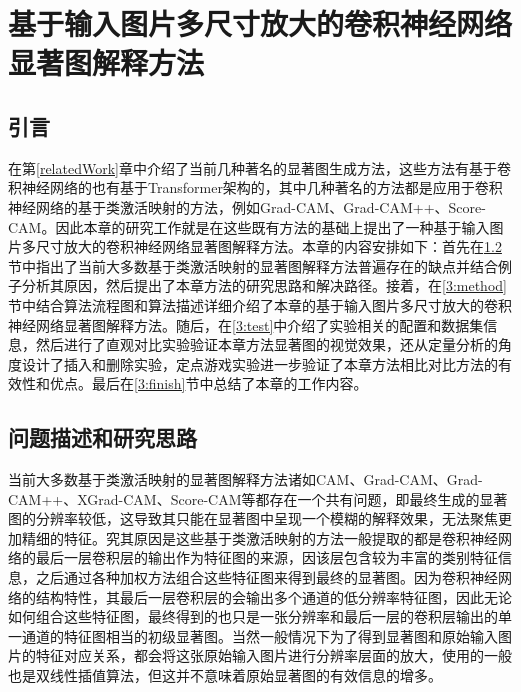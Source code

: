 


\chapter[基于输入图片多尺寸放大的卷积神经网络显著图解释方法]{\texorpdfstring{基于输入图片多尺寸放大的卷积神经网络\\显著图解释方法}{基于输入图片多尺寸放大的卷积神经网络显著图解释方法}}\label{MSGCAM}
\thispagestyle{others}
\pagestyle{others}
\xiaosi

\section{引言}
在第\ref{relatedWork}章中介绍了当前几种著名的显著图生成方法，这些方法有基于卷积神经网络的也有基于Transformer架构的，其中几种著名的方法都是应用于卷积神经网络的基于类激活映射的方法，例如Grad-CAM、Grad-CAM++、Score-CAM。因此本章的研究工作就是在这些既有方法的基础上提出了一种基于输入图片多尺寸放大的卷积神经网络显著图解释方法。本章的内容安排如下：首先在\ref{3:problem}节中指出了当前大多数基于类激活映射的显著图解释方法普遍存在的缺点并结合例子分析其原因，然后提出了本章方法的研究思路和解决路径。接着，在\ref{3:method}节中结合算法流程图和算法描述详细介绍了本章的基于输入图片多尺寸放大的卷积神经网络显著图解释方法。随后，在\ref{3:test}中介绍了实验相关的配置和数据集信息，然后进行了直观对比实验验证本章方法显著图的视觉效果，还从定量分析的角度设计了插入和删除实验，定点游戏实验进一步验证了本章方法相比对比方法的有效性和优点。最后在\ref{3:finish}节中总结了本章的工作内容。

\section{问题描述和研究思路}\label{3:problem}
当前大多数基于类激活映射的显著图解释方法诸如CAM、Grad-CAM、Grad-CAM++、XGrad-CAM、Score-CAM等都存在一个共有问题，即最终生成的显著图的分辨率较低，这导致其只能在显著图中呈现一个模糊的解释效果，无法聚焦更加精细的特征。究其原因是这些基于类激活映射的方法一般提取的都是卷积神经网络的最后一层卷积层的输出作为特征图的来源，因该层包含较为丰富的类别特征信息，之后通过各种加权方法组合这些特征图来得到最终的显著图。因为卷积神经网络的结构特性，其最后一层卷积层的会输出多个通道的低分辨率特征图，因此无论如何组合这些特征图，最终得到的也只是一张分辨率和最后一层的卷积层输出的单一通道的特征图相当的初级显著图。当然一般情况下为了得到显著图和原始输入图片的特征对应关系，都会将这张原始输入图片进行分辨率层面的放大，使用的一般也是双线性插值算法，但这并不意味着原始显著图的有效信息的增多。

